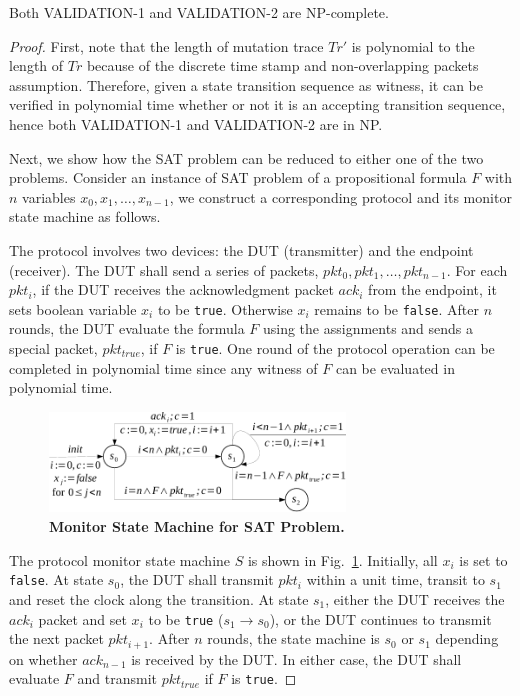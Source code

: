 \begin{lemma}
  \label{lem:sub}
  Both VALIDATION-1 and VALIDATION-2 are NP-complete.
\end{lemma}
\begin{proof}
  First, note that the length of mutation trace $Tr'$ is polynomial to the
  length of $Tr$ because of the discrete time stamp and non-overlapping packets
  assumption.
  Therefore, given a state transition sequence as witness, it can be verified in
  polynomial time whether or not it is an accepting transition sequence, hence
  both VALIDATION-1 and VALIDATION-2 are in NP.

  Next, we show how the SAT problem can be reduced to either one of the two
  problems.
  Consider an instance of SAT problem of a propositional formula $F$ with $n$
  variables $x_0,x_1,\ldots, x_{n-1}$, we construct a corresponding protocol and
  its monitor state machine as follows.

  The protocol involves two devices: the DUT (transmitter) and the endpoint
  (receiver).
  The DUT shall send a series of packets, $pkt_0, pkt_1,\ldots, pkt_{n-1}$.
  For each $pkt_i$, if the DUT receives the
  acknowledgment packet $ack_i$ from the endpoint, it sets boolean variable
  $x_i$ to be \texttt{true}.
  Otherwise $x_i$ remains to be \texttt{false}.
  After $n$ rounds, the DUT evaluate the formula $F$ using the assignments and
  sends a special packet, $pkt_{true}$, if $F$ is \texttt{true}.
  One round of the protocol operation can be completed in polynomial time since
  any witness of $F$ can be evaluated in polynomial time.

  \begin{figure}[t!]
    \centering
    \includegraphics[width=0.7\textwidth]{./figures/sat_sm.pdf}
    \caption{\textbf{Monitor State Machine for SAT Problem.}}
    \label{fig:sat}
  \end{figure}



  The protocol monitor state machine $S$ is shown in Fig.~\ref{fig:sat}.
  Initially, all $x_i$ is set to \texttt{false}.
  At state $s_0$, the DUT shall transmit $pkt_i$ within a unit time, transit to
  $s_1$ and reset the clock along the transition.
  At state $s_1$, either the DUT receives the $ack_i$ packet and
  set $x_i$ to be \texttt{true} ($s_1 \rightarrow s_0$), or the DUT continues to
  transmit the next packet $pkt_{i+1}$.
  After $n$ rounds, the state machine is $s_0$ or $s_1$ depending on whether
  $ack_{n-1}$ is received by the DUT.
  In either case, the DUT shall evaluate $F$ and transmit $pkt_{true}$ if $F$ is
  \texttt{true}.  


\end{proof}
